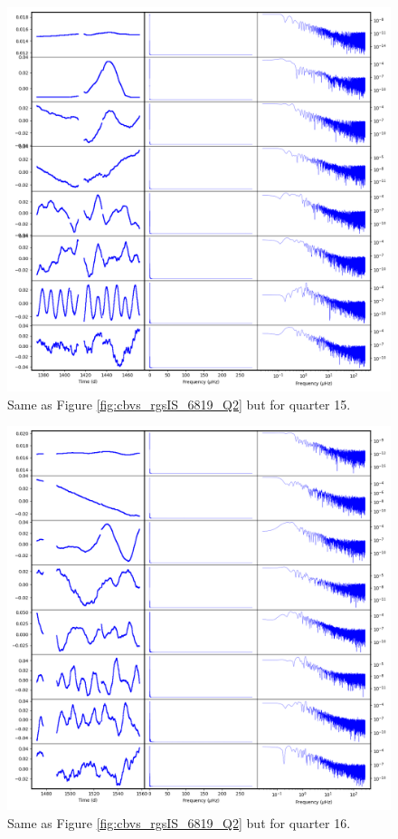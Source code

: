 \begin{figure}
    \centering
    \includegraphics[width=\linewidth]{Chapter_Appended/AppB/cbv_6819_rgs_q15.png}
    \caption{Same as Figure \ref{fig:cbvs_rgsIS_6819_Q2} but for quarter 15.}
    \label{fig:cbvs_rgsIS_6819_Q15}
\end{figure}


\begin{figure}
    \centering
    \includegraphics[width=\linewidth]{Chapter_Appended/AppB/cbv_6819_rgs_q16.png}
    \caption{Same as Figure \ref{fig:cbvs_rgsIS_6819_Q2} but for quarter 16.}
    \label{fig:cbvs_rgsIS_6819_Q16}
\end{figure}


